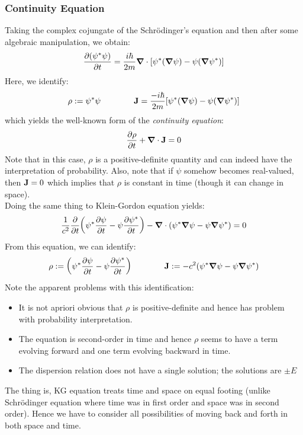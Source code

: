 \subsubsection{Continuity Equation}
Taking the complex cojungate of the Schr\"odinger's equation and then after some algebraic manipulation, we obtain:
\begin{align*}
     \pdv{(\psi^*\psi)}{t} = \frac{i\hbar}{2m} \grad \cdot \qty[\psi^*(\grad\psi) - \psi (\grad \psi^*)]
\end{align*}
Here, we identify:
$$\rho := \psi^*\psi\qquad\qquad \vb{J} = \frac{-i\hbar}{2m}\qty[\psi^*(\grad\psi) - \psi (\grad \psi^*)]$$ which yields the well-known form of the \textit{continuity equation}:
$$\pdv{\rho}{t} + \grad\cdot\vb{J} = 0$$
Note that in this case, $\rho$ is a positive-definite quantity and can indeed have the interpretation of probability. Also, note that if $\psi$ somehow becomes real-valued, then $\vb{J}=0$ which implies that $\rho$ is constant in time (though it can change in space). \\[0.2cm]
Doing the same thing to Klein-Gordon equation yields:
$$\frac{1}{c^2}\pdv{t}\qty(\psi^*\pdv{\psi}{t}-\psi\pdv{\psi^*}{t})-\grad\cdot\qty(\psi^*\grad{\psi}-\psi\grad{\psi^*})=0$$
From this equation, we can identify:
$$\rho :=  \qty(\psi^*\pdv{\psi}{t}-\psi\pdv{\psi^*}{t}) \qquad\qquad \vb{J} := - c^2\qty(\psi^*\grad{\psi}-\psi\grad{\psi^*})$$
Note the apparent problems with this identification:
\begin{itemize}
    \item It is not apriori obvious that $\rho$ is positive-definite and hence has problem with probability interpretation.
    \item The equation is second-order in time and hence $\rho$ seems to have a term evolving forward and one term evolving backward in time. 
    \item The dispersion relation does not have a single solution; the solutions are $\pm E$
\end{itemize}
The thing is, KG equation treats time and space on equal footing (unlike Schr\"odinger equation where time was in first order and space was in second order). Hence we have to consider all possibilities of moving back and forth in both space and time. 